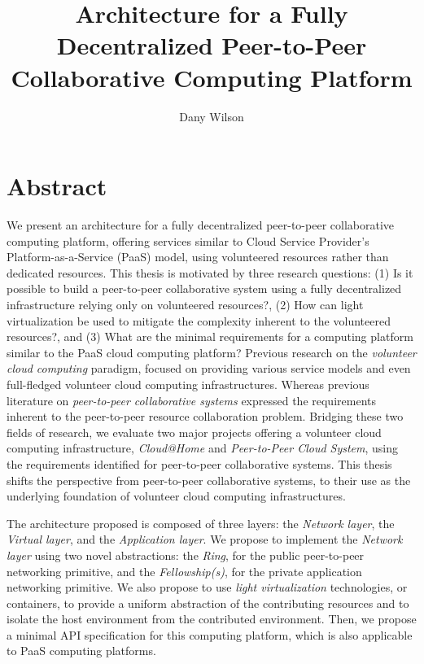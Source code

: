 \documentclass[12pt, titlepage]{uo_temp}
\title{Architecture for a Fully Decentralized Peer-to-Peer Collaborative Computing Platform}
\author{Dany Wilson}
\begin{document}
\maketitle

\chapter*{Abstract}%
%
We present an architecture for a fully decentralized peer-to-peer collaborative computing
platform, offering services similar to Cloud Service Provider's Platform-as-a-Service
(PaaS) model, using volunteered resources rather than dedicated resources. This thesis is
motivated by three research questions: (1) Is it possible to build a peer-to-peer
collaborative system using a fully decentralized infrastructure relying only on
volunteered resources?, (2) How can light virtualization be used to mitigate the
complexity inherent to the volunteered resources?, and (3) What are the minimal
requirements for a computing platform similar to the PaaS cloud computing platform?
Previous research on the \emph{volunteer cloud computing} paradigm, focused on providing
various service models and even full-fledged volunteer cloud computing
infrastructures. Whereas previous literature on \emph{peer-to-peer collaborative systems}
expressed the requirements inherent to the peer-to-peer resource collaboration
problem. Bridging these two fields of research, we evaluate two major projects offering a
volunteer cloud computing infrastructure, \emph{Cloud@Home} and \emph{Peer-to-Peer Cloud
  System}, using the requirements identified for peer-to-peer collaborative systems. This
thesis shifts the perspective from peer-to-peer collaborative systems, to their use as the
underlying foundation of volunteer cloud computing infrastructures.

The architecture proposed is composed of three layers: the \emph{Network layer}, the
\emph{Virtual layer}, and the \emph{Application layer}. We propose to implement the
\emph{Network layer} using two novel abstractions: the \emph{Ring}, for the public
peer-to-peer networking primitive, and the \emph{Fellowship(s)}, for the private
application networking primitive. We also propose to use \emph{light virtualization}
technologies, or containers, to provide a uniform abstraction of the contributing
resources and to isolate the host environment from the contributed environment. Then,
we propose a minimal API specification for this computing platform, which is also
applicable to PaaS computing platforms.
\end{document}

